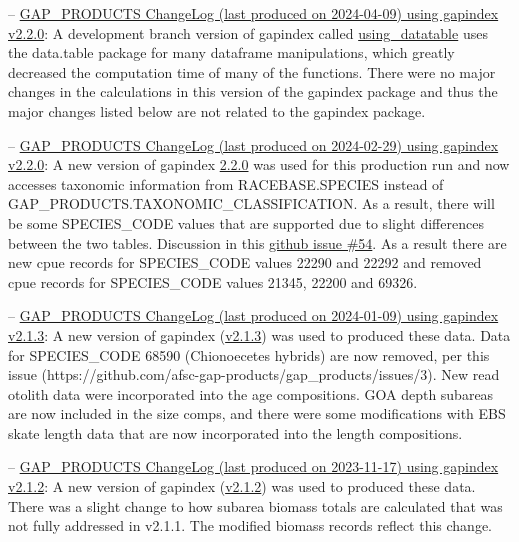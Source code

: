 \documentclass[
  letterpaper,
  oneside,
  open=any]{scrbook}
\begin{document}
--
\href{https://raw.githubusercontent.com/afsc-gap-products/gap_products/main/content/intro-news/2024-04-09.txt}{GAP\_PRODUCTS
ChangeLog (last produced on 2024-04-09) using gapindex v2.2.0}: A
development branch version of gapindex called
\href{https://github.com/afsc-gap-products/gap_products/tree/using_datatable}{using\_datatable}
uses the data.table package for many dataframe manipulations, which
greatly decreased the computation time of many of the functions. There
were no major changes in the calculations in this version of the
gapindex package and thus the major changes listed below are not related
to the gapindex package.

--
\href{https://raw.githubusercontent.com/afsc-gap-products/gap_products/main/content/intro-news/2024-02-29.txt}{GAP\_PRODUCTS
ChangeLog (last produced on 2024-02-29) using gapindex v2.2.0}: A new
version of gapindex
\href{https://github.com/afsc-gap-products/gapindex/releases/tag/v2.2.0}{2.2.0}
was used for this production run and now accesses taxonomic information
from RACEBASE.SPECIES instead of
GAP\_PRODUCTS.TAXONOMIC\_CLASSIFICATION. As a result, there will be some
SPECIES\_CODE values that are supported due to slight differences
between the two tables. Discussion in this
\href{https://github.com/afsc-gap-products/gapindex/issues/54}{github
issue \#54}. As a result there are new cpue records for SPECIES\_CODE
values 22290 and 22292 and removed cpue records for SPECIES\_CODE values
21345, 22200 and 69326.

--
\href{https://raw.githubusercontent.com/afsc-gap-products/gap_products/main/content/intro-news/2024-01-09.txt}{GAP\_PRODUCTS
ChangeLog (last produced on 2024-01-09) using gapindex v2.1.3}: A new
version of gapindex
(\href{https://github.com/afsc-gap-products/gapindex/releases/tag/v2.1.3}{v2.1.3})
was used to produced these data. Data for SPECIES\_CODE 68590
(Chionoecetes hybrids) are now removed, per this issue
(https://github.com/afsc-gap-products/gap\_products/issues/3). New read
otolith data were incorporated into the age compositions. GOA depth
subareas are now included in the size comps, and there were some
modifications with EBS skate length data that are now incorporated into
the length compositions.

--
\href{https://raw.githubusercontent.com/afsc-gap-products/gap_products/main/content/intro-news/2023-11-17.txt}{GAP\_PRODUCTS
ChangeLog (last produced on 2023-11-17) using gapindex v2.1.2}: A new
version of gapindex
(\href{https://github.com/afsc-gap-products/gapindex/releases/tag/v2.1.2}{v2.1.2})
was used to produced these data. There was a slight change to how
subarea biomass totals are calculated that was not fully addressed in
v2.1.1. The modified biomass records reflect this change.
\end{document}
